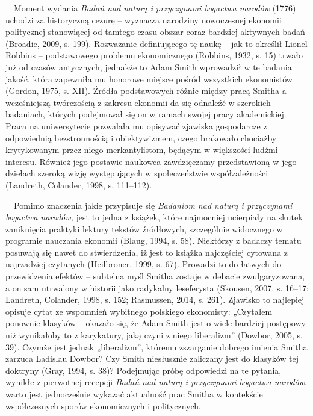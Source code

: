 \documentclass[a4paper]{article}
\newcommand\textstyleFootnoteCharacters[1]{\textsuperscript{#1}}
\begin{document}
\ \ Moment wydania \textit{Badań nad naturą i przyczynami bogactwa narodów} (1776) uchodzi za historyczną cezurę –
wyznacza narodziny nowoczesnej ekonomii politycznej stanowiącej od tamtego czasu obszar coraz bardziej aktywnych badań
\label{ref:RNDxlNYKcaRLz}(Broadie, 2009, s. 199). Rozważanie definiującego tę naukę – jak to określił Lionel Robbins –
podstawowego problemu ekonomicznego \label{ref:RNDnxuF1ebG8p}(Robbins, 1932, s. 15) trwało już od czasów antycznych,
jednakże to Adam Smith wprowadził w te badania jakość, która zapewniła mu honorowe miejsce pośród wszystkich
ekonomistów \label{ref:RNDXwmhFbTJ5B}(Gordon, 1975, s. XII). Źródła podstawowych różnic między pracą Smitha a
wcześniejszą twórczością z zakresu ekonomii da się odnaleźć w szerokich badaniach, których podejmował się on w ramach
swojej pracy akademickiej. Praca na uniwersytecie pozwalała mu opisywać zjawiska gospodarcze z odpowiednią
bezstronnością i obiektywizmem, czego brakowało chociażby krytykowanym przez niego merkantylistom, będącym w większości
ludźmi interesu. Również jego postawie naukowca zawdzięczamy przedstawioną w jego dziełach szeroką wizję występujących
w społeczeństwie współzależności \label{ref:RNDQbbqHBuaQg}(Landreth, Colander, 1998, s. 111–112).

 \ \ Pomimo znaczenia jakie przypisuje się \textit{Badaniom nad naturą i przyczynami bogactwa narodów,} jest to jedna z
książek, które najmocniej ucierpiały na skutek zaniknięcia praktyki lektury tekstów źródłowych, szczególnie widocznego
w programie nauczania ekonomii \label{ref:RNDwb8UrvF6xd}(Blaug, 1994, s. 58). Niektórzy z badaczy tematu posuwają się
nawet do stwierdzenia, iż jest to książka najczęściej cytowana z najrzadziej czytanych
\label{ref:RNDhU0CYVU7xS}(Heilbroner, 1999, s. 67). Prowadzi to do łatwych do przewidzenia efektów – subtelna myśl
Smitha zostaje w debacie zwulgaryzowana, a on sam utrwalony w historii jako radykalny leseferysta
\label{ref:RNDllaqGb90E5}(Skousen, 2007, s. 16–17; Landreth, Colander, 1998, s. 152; Rasmussen, 2014, s. 261). Zjawisko
to najlepiej opisuje cytat ze wspomnień wybitnego polskiego ekonomisty: „Czytałem ponownie klasyków – okazało się, że
Adam Smith jest o wiele bardziej postępowy niż wynikałoby to z karykatury, jaką czyni z niego
liberalizm”\textstyleFootnoteCharacters{ }\label{ref:RNDuVHaEp23gh}(Dowbor, 2005, s. 39). Czymże jest jednak
„liberalizm”, któremu zszarganie dobrego imienia Smitha zarzuca Ladislau Dowbor? Czy Smith niesłusznie zaliczany jest
do klasyków tej doktryny \label{ref:RNDk1CfNtw5Df}(Gray, 1994, s. 38)? Podejmując próbę odpowiedzi na te pytania,
wynikłe z pierwotnej recepcji \textit{Badań nad naturą i przyczynami bogactwa narodów}, warto jest jednocześnie wykazać
aktualność prac Smitha w kontekście współczesnych sporów ekonomicznych i politycznych.
\end{document}
